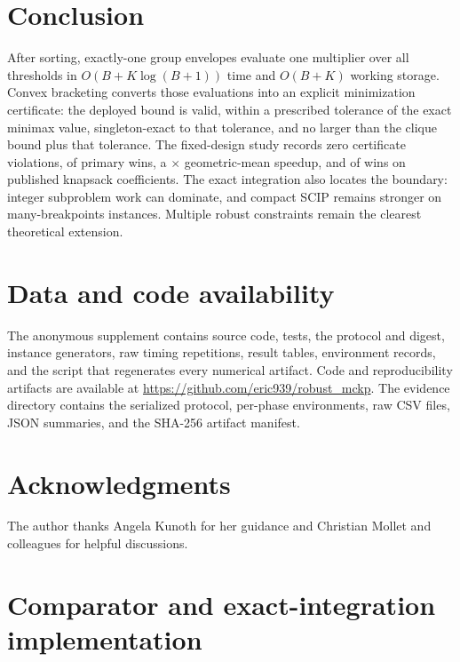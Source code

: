 \documentclass[11pt]{article}
\theoremstyle{plain}
\theoremstyle{definition}
\theoremstyle{remark}
\begin{document}
\section{Conclusion}\label{sec:conclusion}

After sorting, exactly-one group envelopes evaluate one multiplier over all thresholds in $O(B+K\log(B+1))$ time and $O(B+K)$ working storage.  Convex bracketing converts those evaluations into an explicit minimization certificate: the deployed bound is valid, within a prescribed tolerance of the exact minimax value, singleton-exact to that tolerance, and no larger than the clique bound plus that tolerance.  The fixed-design study records zero certificate violations, \PubPrimaryWins{} of \PubPrimaryCases{} primary wins, a \PubPrimaryGeoSpeedup$\times$ geometric-mean speedup, and \PubExternalWins{} of \PubExternalCases{} wins on published knapsack coefficients.  The exact integration also locates the boundary: integer subproblem work can dominate, and compact SCIP remains stronger on many-breakpoints instances.  Multiple robust constraints remain the clearest theoretical extension.

\section*{Data and code availability}
\ifblind
The anonymous supplement contains source code, tests, the protocol and digest, instance generators, raw timing repetitions, result tables, environment records, and the script that regenerates every numerical artifact.
\else
Code and reproducibility artifacts are available at
\url{https://github.com/eric939/robust_mckp}.  The evidence directory contains the serialized protocol, per-phase environments, raw CSV files, JSON summaries, and the SHA-256 artifact manifest.
\fi

\ifblind\else
\section*{Acknowledgments}
The author thanks Angela Kunoth for her guidance and Christian Mollet and colleagues for helpful discussions.
\fi

\fi

\ifincludeappendix
\FloatBarrier
\appendix
{}

\section{Comparator and exact-integration implementation}\label{app:implementation}
\end{document}
